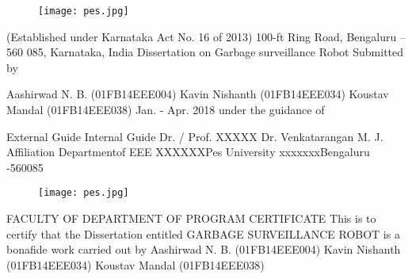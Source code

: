 \documentclass[a4paper,12pt]{article}
\begin{document}
	\begin{center}
		\begin{figure}[h!]
			\centering
			\texttt{[image: pes.jpg]}
		\end{figure}

		 (\large Established under Karnataka Act No. 16 of 2013) \newline
		   \vspace{8mm}
		100-ft Ring Road, Bengaluru – 560 085, Karnataka, India
		  \vspace{8mm}
		Dissertation on\newline
		 \vspace{8mm}
		\huge Garbage surveillance Robot   \vspace{2mm}\newline
	 \large	Submitted by\newline
	
\large	Aashirwad N. B. (01FB14EEE004)\newline
		Kavin Nishanth (01FB14EEE034) \newline
		\vspace{0.5mm}
		Koustav Mandal (01FB14EEE038) \newline
		       Jan. - Apr.  2018\newline
		     under the guidance of\newline
		     
External Guide  \hfill                              Internal Guide\newline     
Dr. / Prof. XXXXX   \hfill                          Dr. Venkatarangan M. J.\newline
Affiliation	 \hfill  
Departmentof EEE\newline
XXXXXX\hfill Pes University \newline
xxxxxxx\hfill Bengaluru -560085
\end{center} 
\newpage
    \begin{figure}[h!]
	\centering
	\texttt{[image: pes.jpg]}
    \end{figure} 

    \begin{center}
    \large	FACULTY OF\newline 
	DEPARTMENT OF \newline
		\vspace{8mm}
	PROGRAM \newline
     \Huge CERTIFICATE\newline
      \vspace{4mm}
   \large This is to certify that the Dissertation entitled\newline
       \vspace{2mm}
  \Large GARBAGE SURVEILLANCE \newline 
       ROBOT\newline
  \small is a bonafide work carried out by\newline
  \large
	Aashirwad N. B. (01FB14EEE004) \newline
	Kavin Nishanth (01FB14EEE034)\newline
	Koustav Mandal (01FB14EEE038)\newline
   \end{center}
\end{document}
